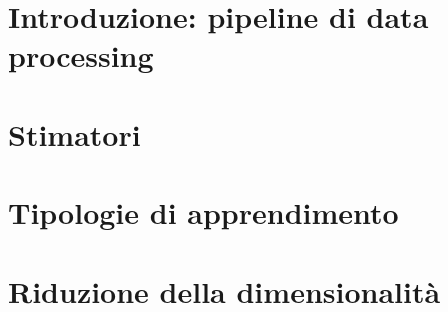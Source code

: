 \documentclass[italian, disablemarginnotes, allowcoloredmath]{../../../Resources/Utils/ClassNotes}
\begin{document}

\section{Introduzione: pipeline di data processing}


\section{Stimatori}


\section{Tipologie di apprendimento}


\section{Riduzione della dimensionalità}

\end{document}

